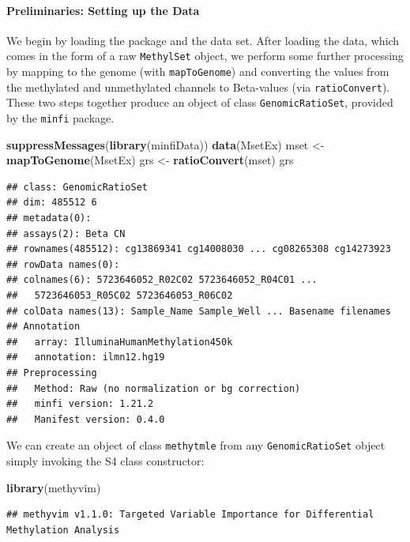 \documentclass[9pt,a4paper,]{extarticle}
\newenvironment{Shaded}{\begin{snugshade}}{\end{snugshade}}
\newcommand{\KeywordTok}[1]{\textcolor[rgb]{0.13,0.29,0.53}{\textbf{#1}}}
\newcommand{\NormalTok}[1]{#1}
\newcommand{\StringTok}[1]{\textcolor[rgb]{0.31,0.60,0.02}{#1}}
\theoremstyle{definition}
\theoremstyle{definition}
\theoremstyle{definition}
\theoremstyle{remark}
\begin{document}
\hypertarget{preliminaries-setting-up-the-data}{%
\paragraph{Preliminaries: Setting up the Data}\label{preliminaries-setting-up-the-data}}

We begin by loading the package and the data set. After loading the data, which
comes in the form of a raw \texttt{MethylSet} object, we perform some further
processing by mapping to the genome (with \texttt{mapToGenome}) and converting the
values from the methylated and unmethylated channels to Beta-values
(via \texttt{ratioConvert}). These two steps together produce an object of class
\texttt{GenomicRatioSet}, provided by the \texttt{minfi} package.

\begin{Shaded}
\begin{Highlighting}[]
\KeywordTok{suppressMessages}\NormalTok{(}\KeywordTok{library}\NormalTok{(minfiData))}
\KeywordTok{data}\NormalTok{(MsetEx)}
\NormalTok{mset <-}\StringTok{ }\KeywordTok{mapToGenome}\NormalTok{(MsetEx)}
\NormalTok{grs <-}\StringTok{ }\KeywordTok{ratioConvert}\NormalTok{(mset)}
\NormalTok{grs}
\end{Highlighting}
\end{Shaded}

\begin{verbatim}
## class: GenomicRatioSet 
## dim: 485512 6 
## metadata(0):
## assays(2): Beta CN
## rownames(485512): cg13869341 cg14008030 ... cg08265308 cg14273923
## rowData names(0):
## colnames(6): 5723646052_R02C02 5723646052_R04C01 ...
##   5723646053_R05C02 5723646053_R06C02
## colData names(13): Sample_Name Sample_Well ... Basename filenames
## Annotation
##   array: IlluminaHumanMethylation450k
##   annotation: ilmn12.hg19
## Preprocessing
##   Method: Raw (no normalization or bg correction)
##   minfi version: 1.21.2
##   Manifest version: 0.4.0
\end{verbatim}

We can create an object of class \texttt{methytmle} from any \texttt{GenomicRatioSet} object
simply invoking the S4 class constructor:

\begin{Shaded}
\begin{Highlighting}[]
\KeywordTok{library}\NormalTok{(methyvim)}
\end{Highlighting}
\end{Shaded}

\begin{verbatim}
## methyvim v1.1.0: Targeted Variable Importance for Differential Methylation Analysis
\end{verbatim}
\end{document}
